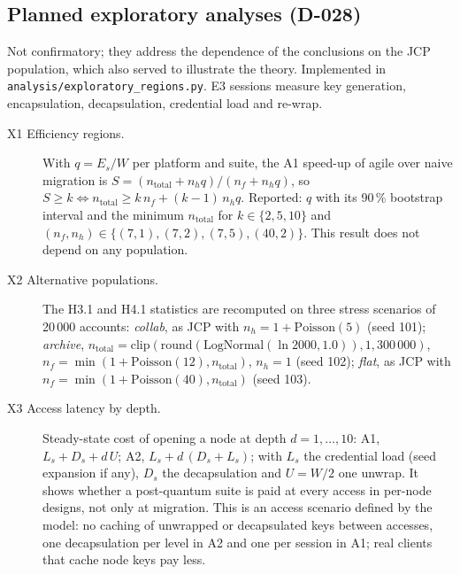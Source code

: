 \documentclass[11pt,a4paper]{article}
\begin{document}
\subsection*{Planned exploratory analyses (D-028)}
Not confirmatory; they address the dependence of the conclusions on the JCP population, which also served to illustrate the theory. Implemented in \texttt{analysis/\allowbreak{}exploratory\_\allowbreak{}regions.py}. E3 sessions measure key generation, encapsulation, decapsulation, credential load and re-wrap.
\begin{description}
\item[X1 Efficiency regions.] With $q = E_s/W$ per platform and suite, the A1 speed-up of agile over naive migration is $S = (n_{\mathrm{total}} + n_h q)/(n_f + n_h q)$, so $S \ge k \iff n_{\mathrm{total}} \ge k\,n_f + (k-1)\,n_h q$. Reported: $q$ with its 90\,\% bootstrap interval and the minimum $n_{\mathrm{total}}$ for $k \in \{2, 5, 10\}$ and $(n_f, n_h) \in \{(7,1), (7,2), (7,5), (40,2)\}$. This result does not depend on any population.
\item[X2 Alternative populations.] The H3.1 and H4.1 statistics are recomputed on three stress scenarios of 20\,000 accounts: \emph{collab}, as JCP with $n_h = 1 + \mathrm{Poisson}(5)$ (seed 101); \emph{archive}, $n_{\mathrm{total}} = \mathrm{clip}(\mathrm{round}(\mathrm{LogNormal}(\ln 2000, 1.0)), 1, 300\,000)$, $n_f = \min(1 + \mathrm{Poisson}(12), n_{\mathrm{total}})$, $n_h = 1$ (seed 102); \emph{flat}, as JCP with $n_f = \min(1 + \mathrm{Poisson}(40), n_{\mathrm{total}})$ (seed 103).
\item[X3 Access latency by depth.] Steady-state cost of opening a node at depth $d = 1, \ldots, 10$: A1, $L_s + D_s + d\,U$; A2, $L_s + d\,(D_s + L_s)$; with $L_s$ the credential load (seed expansion if any), $D_s$ the decapsulation and $U = W/2$ one unwrap. It shows whether a post-quantum suite is paid at every access in per-node designs, not only at migration. This is an access scenario defined by the model: no caching of unwrapped or decapsulated keys between accesses, one decapsulation per level in A2 and one per session in A1; real clients that cache node keys pay less.
\end{description}

\end{document}
